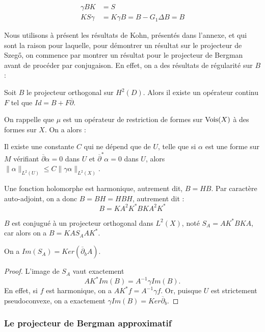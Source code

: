 \begin{align*}
  \gamma B K &= S\\
  K S \gamma &= K\gamma B = B-G_1\Delta B = B
\end{align*}

Nous utilisons à présent les résultats de Kohn, présentés dans l'annexe, et qui sont la raison pour laquelle, pour démontrer un résultat sur le projecteur de Szeg\H{o}, on commence par montrer un résultat pour le projecteur de Bergman avant de procéder par conjugaison. En effet, on a des résultats de régularité sur $B$ :
\begin{prop}
Soit $B$ le projecteur orthogonal sur $H^2(D)$. Alors il existe un opérateur continu $F$ tel que $Id = B + F\overline{\partial}$.
\end{prop}
On rappelle que $\mu$ est un opérateur de restriction de formes sur $\operatorname{Vois}(X)$ à des formes sur $X$. On a alors :
\begin{prop}
Il existe une constante $C$ qui ne dépend que de $U$, telle que si $\alpha$ est une forme sur $M$ vérifiant $\overline{\partial}\alpha=0$ dans $U$ et $\overline{\partial}^{*}\alpha=0$ dans $U$, alors $\|\alpha\|_{L^2(U)} \leq C\|\gamma\alpha\|_{L^2(X)}$.
\end{prop}

Une fonction holomorphe est harmonique, autrement dit, $B=HB$. Par caractère auto-adjoint, on a donc $B=BH=HBH$, autrement dit :
\begin{equation*}
  B=KA^2K^*BKA^2K^*
\end{equation*}

$B$ est conjugué à un projecteur orthogonal dans $L^2(X)$, noté $S_A = AK^*BKA$, car alors on a $B=KAS_AAK^*$.

\begin{lem}
On a $Im(S_A) = Ker(\overline{\partial}_bA)$.
\end{lem}
\begin{proof}
 L'image de $S_A$ vaut exactement 
 \begin{equation*}
 AK^*Im(B) = A^{-1}\gamma Im(B).
 \end{equation*}
 \noindent En effet, si $f$ est harmonique, on a $AK^*f=A^{-1}\gamma f$. Or, puisque $U$ est strictement pseudoconvexe, on a exactement $\gamma Im(B) = Ker \overline{\partial}_b$.
 \end{proof}
 
\subsubsection{Le projecteur de Bergman approximatif}
 
